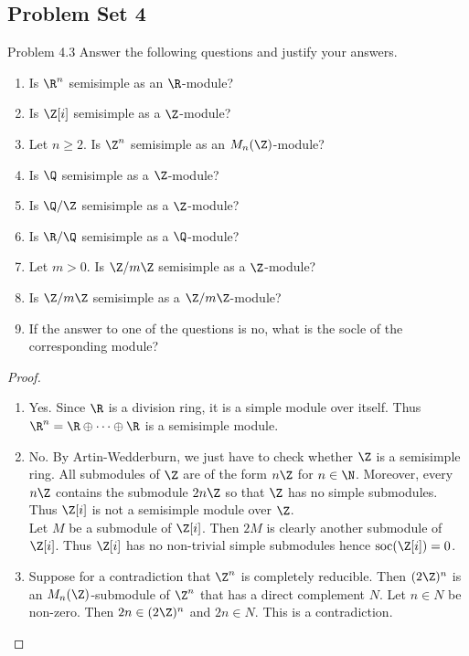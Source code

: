 \documentclass[a4paper]{article}
\begin{document}
\subsection{Problem Set 4}
\begin{ex}{Problem 4.3}{} Answer the following questions and justify your answers. 
\begin{enumerate}
\item Is $\R^n$ semisimple as an $\R$-module?
\item Is $\Z[i]$ semisimple as a $\Z$-module?
\item Let $n\geq 2$. Is $\Z^n$ semisimple as an $M_n(\Z)$-module?
\item Is $\Q$ semisimple as a $\Z$-module?
\item Is $\Q/\Z$ semisimple as a $\Z$-module?
\item Is $\R/\Q$ semisimple as a $\Q$-module?
\item Let $m>0$. Is $\Z/m\Z$ semisimple as a $\Z$-module?
\item Is $\Z/m\Z$ semisimple as a $\Z/m\Z$-module?
\item If the answer to one of the questions is no, what is the socle of the corresponding module?
\end{enumerate} 
\begin{proof}~\\
\begin{enumerate}
\item Yes. Since $\R$ is a division ring, it is a simple module over itself. Thus $\R^n=\R\oplus\cdots\oplus\R$ is a semisimple module. 
\item No. By Artin-Wedderburn, we just have to check whether $\Z$ is a semisimple ring. All submodules of $\Z$ are of the form $n\Z$ for $n\in\N$. Moreover, every $n\Z$ contains the submodule $2n\Z$ so that $\Z$ has no simple submodules. Thus $\Z[i]$ is not a semisimple module over $\Z$. \\

Let $M$ be a submodule of $\Z[i]$. Then $2M$ is clearly another submodule of $\Z[i]$. Thus $\Z[i]$ has no non-trivial simple submodules hence $\text{soc}(\Z[i])=0$. 

\item Suppose for a contradiction that $\Z^n$ is completely reducible. Then $(2\Z)^n$ is an $M_n(\Z)$-submodule of $\Z^n$ that has a direct complement $N$. Let $n\in N$ be non-zero. Then $2n\in(2\Z)^n$ and $2n\in N$. This is a contradiction. \\


\end{enumerate}
\end{proof}
\end{ex}
\end{document}
